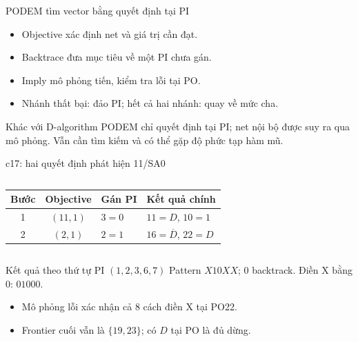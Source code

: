 \begin{frame}{PODEM tìm vector bằng quyết định tại PI}
\begin{itemize}
\item Objective xác định net và giá trị cần đạt.
\item Backtrace đưa mục tiêu về một PI chưa gán.
\item Imply mô phỏng tiến, kiểm tra lỗi tại PO.
\item Nhánh thất bại: đảo PI; hết cả hai nhánh: quay về mức cha.
\end{itemize}
\begin{block}{Khác với D-algorithm}
PODEM chỉ quyết định tại PI; net nội bộ được suy ra qua mô phỏng. Vẫn cần tìm kiếm và có thể gặp độ phức tạp hàm mũ.
\end{block}
\end{frame}

\begin{frame}{c17: hai quyết định phát hiện 11/SA0}
\begin{columns}[c,onlytextwidth]
\centering
\begingroup
\def\pTwoCSeventeenWidth{\linewidth}

\endgroup
{}
\centering\small
\begin{tabular}{ccll}
\hline
Bước & Objective & Gán PI & Kết quả chính\\\hline
1 & $(11,1)$ & $3=0$ & $11=D$, $10=1$\\
2 & $(2,1)$ & $2=1$ & $16=\overline D$, $22=D$\\\hline
\end{tabular}
\end{columns}
\vspace{3mm}
\begin{block}{Kết quả theo thứ tự PI $(1,2,3,6,7)$}
Pattern $X10XX$; 0 backtrack. Điền X bằng 0: $01000$.
\end{block}
\begin{itemize}
\item Mô phỏng lỗi xác nhận cả 8 cách điền X tại PO22.
\item Frontier cuối vẫn là $\{19,23\}$; có $D$ tại PO là đủ dừng.
\end{itemize}
\end{frame}

